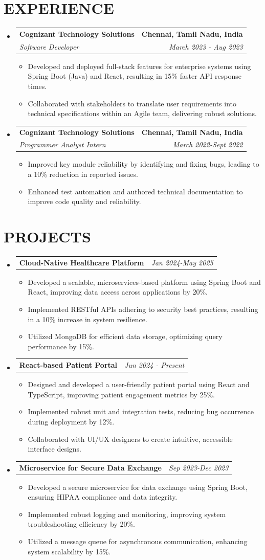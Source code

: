 \documentclass[letterpaper,11pt]{article}
\makeatletter
\newcommand{\resumeItem}[1]{\item\small{{#1 \vspace{-3pt}}}}
\newcommand{\resumeSubheading}[4]{\vspace{-2pt}\item\begin{tabular*}{0.97\textwidth}[t]{l@{\extracolsep{\fill}}r}\textbf{#1} & #2 \\\textit{\small#3} & \textit{\small #4} \\\end{tabular*}\vspace{-7pt}}
\newcommand{\resumeProjectHeading}[2]{\item\begin{tabular*}{0.97\textwidth}{l@{\extracolsep{\fill}}r}\small#1 & #2 \\\end{tabular*}\vspace{-7pt}}
\newcommand{\resumeSubHeadingListStart}{\begin{itemize}[leftmargin=0.15in, label={}]}
\newcommand{\resumeSubHeadingListEnd}{\end{itemize}}
\newcommand{\resumeItemListStart}{\begin{itemize}}
\newcommand{\resumeItemListEnd}{\end{itemize}\vspace{-5pt}}
\makeatother
\begin{document}
\section{{\fontsize{9pt}{20pt}\selectfont \textbf{EXPERIENCE}}}
\resumeSubHeadingListStart
\resumeSubheading{Cognizant Technology Solutions}{\textbf{Chennai, Tamil Nadu, India}}{Software Developer}{March 2023 - Aug 2023}
\resumeItemListStart
\resumeItem{Developed and deployed full-stack features for enterprise systems using Spring Boot (Java) and React, resulting in 15\% faster API response times.}
\resumeItem{Collaborated with stakeholders to translate user requirements into technical specifications within an Agile team, delivering robust solutions.}
\resumeItemListEnd
\resumeSubheading{Cognizant Technology Solutions}{\textbf{Chennai, Tamil Nadu, India}}{Programmer Analyst Intern}{March 2022-Sept 2022}
\resumeItemListStart
\resumeItem{Improved key module reliability by identifying and fixing bugs, leading to a 10\% reduction in reported issues.}
\resumeItem{Enhanced test automation and authored technical documentation to improve code quality and reliability.}
\resumeItemListEnd
\resumeSubHeadingListEnd
\vspace{-17pt}

\section{{\fontsize{9pt}{20pt}\selectfont \textbf{PROJECTS}}}
\resumeSubHeadingListStart
\resumeProjectHeading{\textbf{Cloud-Native Healthcare Platform}}{\textit{Jan 2024-May 2025}}
\resumeItemListStart
\resumeItem{Developed a scalable, microservices-based platform using Spring Boot and React, improving data access across applications by 20\%.}
\resumeItem{Implemented RESTful APIs adhering to security best practices, resulting in a 10\% increase in system resilience.}
\resumeItem{Utilized MongoDB for efficient data storage, optimizing query performance by 15\%.}
\resumeItemListEnd\vspace{-6pt}
\resumeProjectHeading{\textbf{React-based Patient Portal}}{\textit{Jun 2024 - Present}}
\resumeItemListStart
\resumeItem{Designed and developed a user-friendly patient portal using React and TypeScript, improving patient engagement metrics by 25\%.}
\resumeItem{Implemented robust unit and integration tests, reducing bug occurrence during deployment by 12\%.}
\resumeItem{Collaborated with UI/UX designers to create intuitive, accessible interface designs.}
\resumeItemListEnd\vspace{-6pt}
\resumeProjectHeading{\textbf{Microservice for Secure Data Exchange}}{\textit{Sep 2023-Dec 2023}}
\resumeItemListStart
\resumeItem{Developed a secure microservice for data exchange using Spring Boot, ensuring HIPAA compliance and data integrity.}
\resumeItem{Implemented robust logging and monitoring, improving system troubleshooting efficiency by 20\%.}
\resumeItem{Utilized a message queue for asynchronous communication, enhancing system scalability by 15\%.}
\resumeItemListEnd
\resumeSubHeadingListEnd
\vspace{-17pt}
\end{document}
